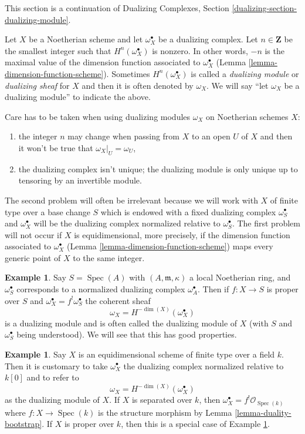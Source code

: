 \documentclass{stacks-project}
\theoremstyle{plain}
\theoremstyle{definition}
\newtheorem{example}[subsection]{Example}
\theoremstyle{remark}
\numberwithin{equation}{subsection}
\def\Spec{\mathop{\mathrm{Spec}}}
\begin{document}
\noindent
This section is a continuation of
Dualizing Complexes, Section \ref{dualizing-section-dualizing-module}.

\medskip\noindent
Let $X$ be a Noetherian scheme and let $\omega_X^\bullet$ be a
dualizing complex. Let $n \in \mathbf{Z}$ be the smallest integer such that
$H^n(\omega_X^\bullet)$ is nonzero. In other words, $-n$ is the maximal
value of the dimension function associated to $\omega_X^\bullet$
(Lemma \ref{lemma-dimension-function-scheme}).
Sometimes $H^n(\omega_X^\bullet)$
is called a {\it dualizing module} or {\it dualizing sheaf}
for $X$ and then it is often denoted
by $\omega_X$. We will say ``let $\omega_X$ be a dualizing module''
to indicate the above.

\medskip\noindent
Care has to be taken when using dualizing modules $\omega_X$ on Noetherian
schemes $X$:
\begin{enumerate}
\item the integer $n$ may change when passing from $X$ to an open $U$
of $X$ and then it won't be true that $\omega_X|_U = \omega_U$,
\item the dualizing complex isn't unique; the dualizing module
is only unique up to tensoring by an invertible module.
\end{enumerate}
The second problem will often be irrelevant because we will work
with $X$ of finite type over a base change $S$ which is
endowed with a fixed dualizing complex $\omega_S^\bullet$ and
$\omega_X^\bullet$ will be the dualizing complex normalized relative
to $\omega_S^\bullet$.
The first problem will not occur if $X$ is equidimensional, more precisely,
if the dimension function associated to $\omega_X^\bullet$
(Lemma \ref{lemma-dimension-function-scheme})
maps every generic point of $X$ to the same integer.

\begin{example}
\label{example-proper-over-local}
Say $S = \Spec(A)$ with $(A, \mathfrak m, \kappa)$
a local Noetherian ring, and $\omega_S^\bullet$ corresponds to
a normalized dualizing complex $\omega_A^\bullet$. Then if
$f : X \to S$ is proper over $S$ and $\omega_X^\bullet = f^!\omega_S^\bullet$
the coherent sheaf
$$
\omega_X = H^{-\dim(X)}(\omega_X^\bullet)
$$
is a dualizing module and is often called the dualizing module
of $X$ (with $S$ and $\omega_S^\bullet$ being understood). We will
see that this has good properties.
\end{example}

\begin{example}
\label{example-equidimensional-over-field}
Say $X$ is an equidimensional scheme of finite type
over a field $k$. Then it is customary to take
$\omega_X^\bullet$ the dualizing complex normalized relative to $k[0]$
and to refer to
$$
\omega_X = H^{-\dim(X)}(\omega_X^\bullet)
$$
as the dualizing module of $X$. If $X$ is separated over $k$, then
$\omega_X^\bullet = f^!\mathcal{O}_{\Spec(k)}$ where
$f : X \to \Spec(k)$ is the structure morphism by
Lemma \ref{lemma-duality-bootstrap}. If $X$ is proper over $k$, then
this is a special case of Example \ref{example-proper-over-local}.
\end{example}
\end{document}
